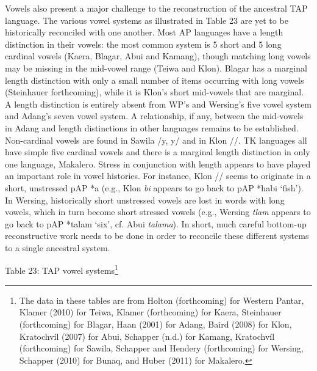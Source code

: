 \documentclass[a4paper]{article}
\begin{document}
Vowels also present a major challenge to the reconstruction of the ancestral TAP language. The various vowel systems as illustrated in Table 23 are yet to be historically reconciled with one another. Most AP languages have a length distinction in their vowels: the most common system is 5 short and 5 long cardinal vowels (Kaera, Blagar, Abui and Kamang), though matching long vowels may be missing in the mid-vowel range (Teiwa and Klon). Blagar has a marginal length distinction with only a small number of items occurring with long vowels (Steinhauer forthcoming), while it is Klon{\textquoteright}s short mid-vowels that are marginal. A length distinction is entirely absent from WP{\textquoteright}s and Wersing{\textquoteright}s five vowel system and Adang{\textquoteright}s seven vowel system. A relationship, if any, between the mid-vowels in Adang and length distinctions in other languages remains to be established. Non-cardinal vowels are found in Sawila /y, y{\textlengthmark}/ and in Klon /{\textschwa}/. TK languages all have simple five cardinal vowels and there is a marginal length distinction in only one language, Makalero. Stress in conjunction with length appears to have played an important role in vowel histories. For instance, Klon /{\textschwa}/ seems to originate in a short, unstressed pAP *a (e.g., Klon \textit{{\textschwa}bi} appears to go back to pAP *ha{\textprimstress}bi {\textquoteleft}fish{\textquoteright}). In Wersing, historically short unstressed vowels are lost in words with long vowels, which in turn become short stressed vowels (e.g., Wersing \textit{tlam} appears to go back to pAP *tala{\textlengthmark}m {\textquoteleft}six{\textquoteright}, cf. Abui \textit{tala{\textlengthmark}ma}). In short, much careful bottom-up reconstructive work needs to be done in order to reconcile these different systems to a single ancestral system.

{\centering
Table 23: TAP vowel systems\footnote{ The data in these tables are from Holton (forthcoming) for Western Pantar, Klamer (2010) for Teiwa, Klamer (forthcoming) for Kaera, Steinhauer (forthcoming) for Blagar, Haan (2001) for Adang, Baird (2008) for Klon, Kratochv\'il (2007) for Abui, Schapper  (n.d.) for Kamang, Kratochv\'il (forthcoming) for Sawila, Schapper and Hendery (forthcoming) for Wersing, Schapper (2010) for Bunaq, and Huber (2011) for Makalero.}
\par}
\end{document}
